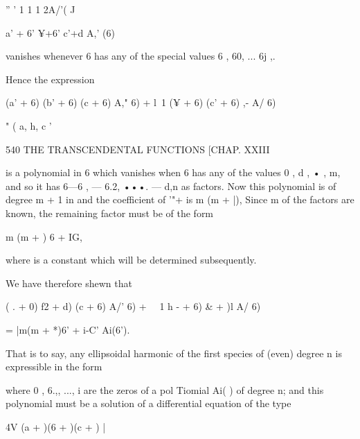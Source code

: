 '' ' 1 1 1 2A/'( J

a' + 6' ¥+6' c'+d A,' (6)

vanishes whenever 6 has any of the special values 6 , 60, ... 6j ,.

Hence the expression

(a' + 6) (b' + 6) (c + 6) A," 6) + l\ 1 (¥ + 6) (c' + 6) ,- A/ 6)

" ( a, h, c '

540 THE TRANSCENDENTAL FUNCTIONS [CHAP. XXIII

is a polynomial in 6 which vanishes when 6 has any of the values 0 , d
, • , m, and so it has 6—6 , — 6.2, •••. — d,n as factors. Now this
polynomial is of degree m + 1 in and the coefficient of '"+ is m (m +
|), Since m of the factors are known, the remaining factor must be of
the form

m (m + ) 6 + IG,

where is a constant which will be determined subsequently.

We have therefore shewn that

( . + 0) f2 + d) (c + 6) A/' 6) + \ \ 1 h - + 6) \& + )l A/ 6)

= |m(m + *)6' + i-C' Ai(6').

That is to say, any ellipsoidal harmonic of the first species of
(even) degree n is expressible in the form

where 0 , 6.,, ..., i are the zeros of a pol Tiomial Ai( ) of degree
n; and this polynomial must be a solution of a differential equation
of the type

4V (a + )(6 + )(c + ) |

